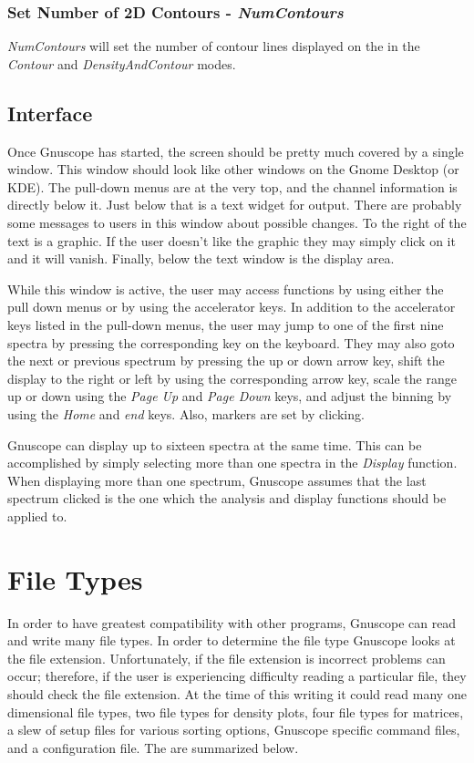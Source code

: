 \subsection{Set Number of 2D Contours - {\it NumContours}}

{\it NumContours} will set the number of contour lines displayed on the in the {\it Contour} and {\it DensityAndContour} modes.

\section{Interface}

Once Gnuscope has started, the screen should be pretty much covered by a single window.  This window should look like other windows on the Gnome Desktop (or KDE).  The pull-down menus are at the very top, and the channel information is directly below it.  Just below that is a text widget for output.  There are probably some messages to users in this window about possible changes.  To the right of the text is a graphic.  If the user doesn't like the graphic they may simply click on it and it will vanish.  Finally, below the text window is the display area.

While this window is active, the user may access functions by using either the pull down menus or by using the accelerator keys.  In addition to the accelerator keys listed in the pull-down menus, the user may jump to one of the first nine spectra by pressing the corresponding key on the keyboard.  They may also goto the next or previous spectrum by pressing the up or down arrow key, shift the display to the right or left by using the corresponding arrow key, scale the range up or down using the {\it Page Up} and {\it Page Down} keys, and adjust the binning by using the {\it Home} and {\it end} keys.  Also, markers are set by clicking.

Gnuscope can display up to sixteen spectra at the same time.  This can be accomplished by simply selecting more than one spectra in the {\it Display} function.  When displaying more than one spectrum, Gnuscope assumes that the last spectrum clicked is the one which the analysis and display functions should be applied to.

\chapter{File Types}

In order to have greatest compatibility with other programs, Gnuscope can read and write many file types.  In order to determine the file type Gnuscope looks at the file extension.  Unfortunately, if the file extension is incorrect problems can occur; therefore, if the user is experiencing difficulty reading a particular file, they should check the file extension.  At the time of this writing it could read many one dimensional file types, two file types for density plots, four file types for matrices, a slew of setup files for various sorting options, Gnuscope specific command files, and a configuration file.  The are summarized below.

